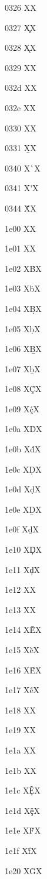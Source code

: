 \documentclass[11pt]{article}
\begin{document}
0326 X{\cb{}}X

0327 X{\c{}}X

0328 X{\k{}}X

0329 X{\textsyllabic{}}X

032d X{\textsubcircum{}}X

032e X{\textsubbreve{}}X

0330 X{\textsubtilde{}}X

0331 X{\b{}}X

0340 X{\`{}}X

0341 X{\'{}}X

0344 X{\'{\"{}}}X

1e00 X{}X

1e01 X{}X

1e02 X{\.B}X

1e03 X{\.b}X

1e04 X{\d{B}}X

1e05 X{\d{b}}X

1e06 X{\b{B}}X

1e07 X{\b{b}}X

1e08 X{\'{\c{C}}}X

1e09 X{\'{\c{c}}}X

1e0a X{\.D}X

1e0b X{\.d}X

1e0c X{\d{D}}X

1e0d X{\d{d}}X

1e0e X{\b{D}}X

1e0f X{\b{d}}X

1e10 X{\c{D}}X

1e11 X{\c{d}}X

1e12 X{}X

1e13 X{}X

1e14 X{\`{\={E}}}X

1e15 X{\`{\={e}}}X

1e16 X{\'{\={E}}}X

1e17 X{\'{\={e}}}X

1e18 X{}X

1e19 X{}X

1e1a X{}X

1e1b X{}X

1e1c X{\u{\c{E}}}X

1e1d X{\u{\c{e}}}X

1e1e X{\.F}X

1e1f X{\.f}X

1e20 X{\=G}X
\end{document}
